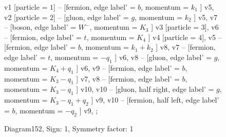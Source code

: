 \documentclass{revtex4}
\begin{document}
\begin{figure}[!htb]
\begin{center}
{    %
v1 [particle = \(1\)] -- [fermion, edge label' = \(b\), momentum = \(k_{1}\) ] v5, 
v2 [particle = \(2\)] -- [gluon, edge label' = \(g\), momentum = \(k_{2}\) ] v5, 
v7 -- [boson, edge label' = \(W^{-}\), momentum = \(K_{3}\) ] v3 [particle = \(3\)], 
v6 -- [fermion, edge label' = \(t\), momentum = \(K_{4}\) ] v4 [particle = \(4\)], 
v5 -- [fermion, edge label' = \(b\), momentum = \(k_{1} + k_{2}\) ] v8, 
v7 -- [fermion, edge label' = \(t\), momentum = \(-q_{1}\) ] v6, 
v8 -- [gluon, edge label' = \(g\), momentum = \(K_{4} + q_{1}\) ] v6, 
v9 -- [fermion, edge label' = \(b\), momentum = \(K_{3} - q_{1}\) ] v7, 
v8 -- [fermion, edge label' = \(b\), momentum = \(K_{3} - q_{1}\) ] v10, 
v10 -- [gluon, half right, edge label' = \(g\), momentum = \(K_{3} - q_{1} + q_{2}\) ] v9, 
v10 -- [fermion, half left, edge label' = \(b\), momentum = \(-q_{2}\) ] v9, 
};
\end{center}
\caption{Diagram152, Sign: 1, Symmetry factor: 1}
\end{figure}
\newpage
\end{document}
